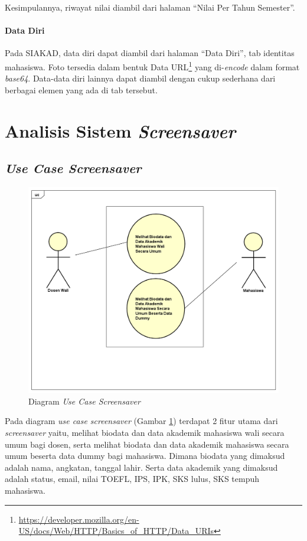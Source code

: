 Kesimpulannya, riwayat nilai diambil dari halaman ``Nilai Per Tahun Semester''.

\paragraph{Data Diri} Pada SIAKAD, data diri dapat diambil dari halaman ``Data Diri'', tab identitas mahasiswa. Foto tersedia dalam bentuk Data URL\footnote{\url{https://developer.mozilla.org/en-US/docs/Web/HTTP/Basics_of_HTTP/Data_URIs}} yang di-\textit{encode} dalam format \textit{base64}. Data-data diri lainnya dapat diambil dengan cukup sederhana dari berbagai elemen yang ada di tab tersebut.


\section{Analisis Sistem \textit{Screensaver}}

\subsection{\textit{Use Case Screensaver}}

\begin{figure}[H]
	\centering
	\includegraphics[scale=0.38]{Gambar/UseCase.png}
	\caption{Diagram \textit{Use Case Screensaver}}
	\label{fig:3_usecase_diagram}
\end{figure}
    
Pada diagram \textit{use case screensaver} (Gambar \ref{fig:3_usecase_diagram}) terdapat 2 fitur utama dari \textit{screensaver} yaitu, melihat biodata dan data akademik mahasiswa wali secara umum bagi dosen, serta melihat biodata dan data akademik mahasiswa secara umum beserta data dummy bagi mahasiswa. Dimana biodata yang dimaksud adalah nama, angkatan, tanggal lahir. Serta data akademik yang dimaksud adalah status, email, nilai TOEFL, IPS, IPK, SKS lulus, SKS tempuh mahasiswa.

